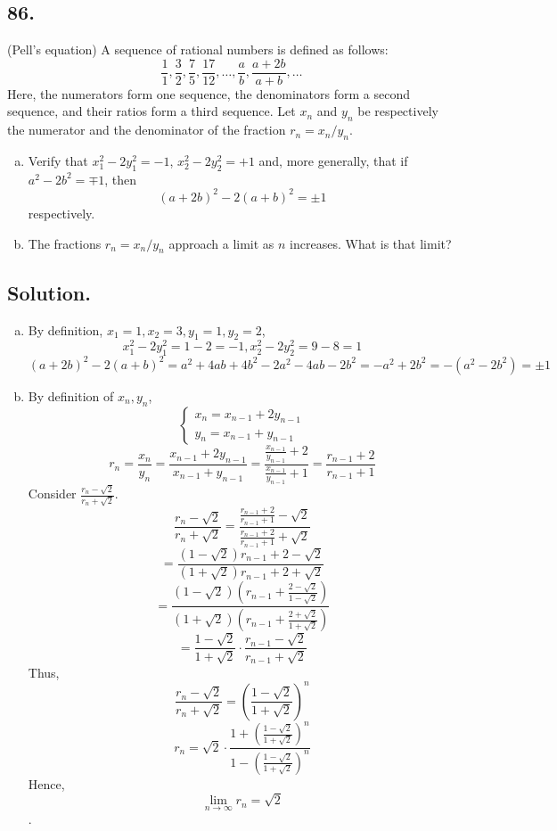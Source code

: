 \documentclass{article}
\begin{document}
\subsection*{86.}
(Pell's equation) A sequence of rational numbers is defined as follows:
\[\frac{1}{1},\frac{3}{2},\frac{7}{5},\frac{17}{12},\dots,\frac{a}{b},\frac{a+2b}{a+b},\dots\]
Here, the numerators form one sequence, the denominators form a second sequence, and their ratios form a third sequence. Let $x_n$ and $y_n$ be respectively the numerator and the denominator of the fraction $r_n=x_n/y_n$.
\begin{enumerate} [a.]
    \item Verify that $x_1^2-2y_1^2=-1$, $x_2^2-2y_2^2=+1$ and, more generally, that if $a^2-2b^2= \mp 1$, then
    \[(a+2b)^2-2(a+b)^2=\pm 1\] respectively.
    \item The fractions $r_n=x_n/y_n$ approach a limit as $n$ increases. What is that limit?
\end{enumerate}
\subsection*{Solution.}
\begin{enumerate}[a.]
    \item By definition, $x_1=1,x_2=3,y_1=1,y_2=2$,
\[x_1^2-2y_1^2=1-2=-1,x_2^2-2y_2^2=9-8=1\]
\[(a+2b)^2-2(a+b)^2=a^2+4ab+4b^2-2a^2-4ab-2b^2=-a^2+2b^2=-(a^2-2b^2)=\pm 1\]
    \item By definition of $x_n,y_n$,
    \[\begin{cases}
    x_n=x_{n-1}+2y_{n-1}\\
    y_n=x_{n-1}+y_{n-1}
    \end{cases}\]
    \[r_n=\frac{x_n}{y_n}=\frac{x_{n-1}+2y_{n-1}}{x_{n-1}+y_{n-1}}=\frac{\frac{x_{n-1}}{y_{n-1}}+2}{\frac{x_{n-1}}{y_{n-1}}+1}=\frac{r_{n-1}+2}{r_{n-1}+1}\]
    Consider $\frac{r_n-\sqrt{2}}{r_n+\sqrt{2}}$.
    \[\frac{r_n-\sqrt{2}}{r_n+\sqrt{2}}=\frac{\frac{r_{n-1}+2}{r_{n-1}+1}-\sqrt{2}}{\frac{r_{n-1}+2}{r_{n-1}+1}+\sqrt{2}}\]
    \[=\frac{(1-\sqrt{2})r_{n-1}+2-\sqrt{2}}{(1+\sqrt{2})r_{n-1}+2+\sqrt{2}}\]
    \[=\frac{(1-\sqrt{2})(r_{n-1}+\frac{2-\sqrt{2}}{1-\sqrt{2}})}{(1+\sqrt{2})(r_{n-1}+\frac{2+\sqrt{2}}{1+\sqrt{2}})}\]
    \[=\frac{1-\sqrt{2}}{1+\sqrt{2}}\cdot\frac{r_{n-1}-\sqrt{2}}{r_{n-1}+\sqrt{2}}\]
    Thus,
    \[\frac{r_n-\sqrt{2}}{r_n+\sqrt{2}}=(\frac{1-\sqrt{2}}{1+\sqrt{2}})^n\]
    \[r_n=\sqrt{2}\cdot\frac{1+(\frac{1-\sqrt{2}}{1+\sqrt{2}})^n}{1-(\frac{1-\sqrt{2}}{1+\sqrt{2}})^n}\]
    Hence,
    \[\lim_{n\to\infty}r_n=\sqrt{2}\].
    
\end{enumerate}
\end{document}
